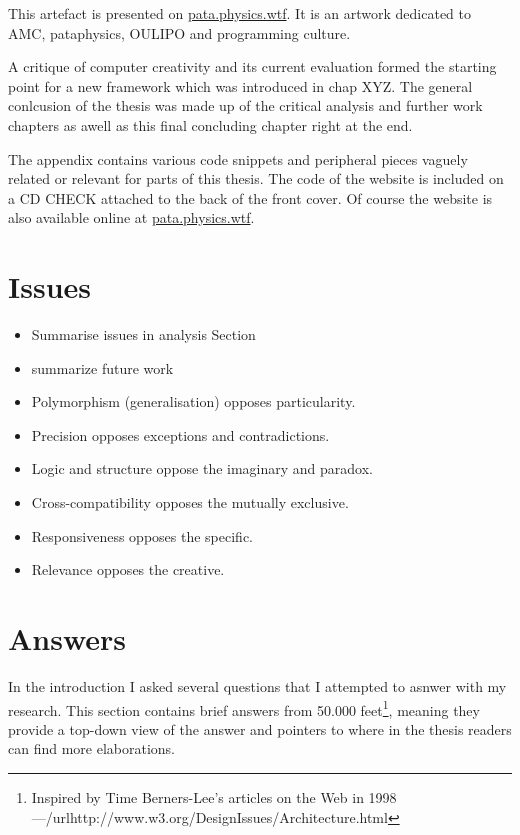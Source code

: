This artefact is presented on \url{pata.physics.wtf}. It is an artwork dedicated to \ac{AMC}, pataphysics, \ac{OULIPO} and programming culture.

A critique of computer creativity and its current evaluation formed the starting point for a new framework which was introduced in chap XYZ. The general conlcusion of the thesis was made up of the critical analysis and further work chapters as awell as this final concluding chapter right at the end.

The appendix contains various code snippets and peripheral pieces vaguely related or relevant for parts of this thesis. The code of the website is included on a CD CHECK attached to the back of the front cover. Of course the website is also available online at \url{pata.physics.wtf}.



\section{Issues}

\begin{itemize}
  \item Summarise issues in analysis Section
  \item summarize future work
\end{itemize}

\begin{itemize}
  \item Polymorphism (generalisation) opposes particularity.
  \item Precision opposes exceptions and contradictions.
  \item Logic and structure oppose the imaginary and paradox.
  \item Cross-compatibility opposes the mutually exclusive.
  \item Responsiveness opposes the specific.
  \item Relevance opposes the creative.
\end{itemize}





\section{Answers}
\label{s:answers}

In the introduction I asked several questions that I attempted to asnwer with my research. This section contains brief answers from 50.000 feet\footnote{Inspired by Time Berners-Lee's articles on the Web in 1998---/url{http://www.w3.org/DesignIssues/Architecture.html}}, meaning they provide a top-down view of the answer and pointers to where in the thesis readers can find more elaborations.

